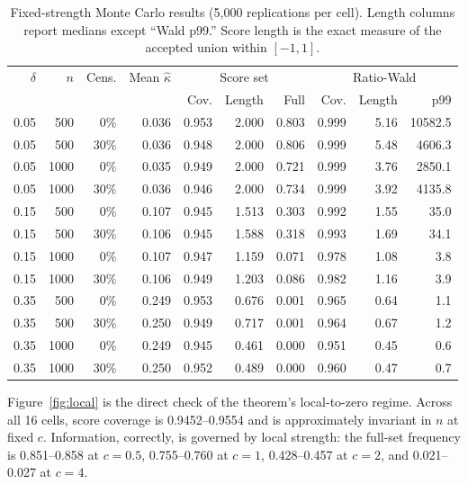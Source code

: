 \documentclass[
  10pt,
  letterpaper,
]{article}
\begin{document}
\begin{table}[tbp]
\centering
\caption{Fixed-strength Monte Carlo results (5,000 replications per
cell). Length columns report medians except ``Wald p99.'' Score length
is the exact measure of the accepted union within $[-1,1]$.}
\label{tab:simulation}
\scriptsize
\setlength{\tabcolsep}{3.2pt}
\begin{tabular}{rrr r rrr rrr}
\toprule
$\delta$ & $n$ & Cens. & Mean $\widehat\kappa$ & \multicolumn{3}{c}{Score set} & \multicolumn{3}{c}{Ratio-Wald} \\
\cmidrule(lr){5-7}\cmidrule(lr){8-10}
&&&& Cov. & Length & Full & Cov. & Length & p99 \\
\midrule
0.05 & 500 & 0\% & 0.036 & 0.953 & 2.000 & 0.803 & 0.999 & 5.16 & 10582.5 \\
0.05 & 500 & 30\% & 0.036 & 0.948 & 2.000 & 0.806 & 0.999 & 5.48 & 4606.3 \\
0.05 & 1000 & 0\% & 0.035 & 0.949 & 2.000 & 0.721 & 0.999 & 3.76 & 2850.1 \\
0.05 & 1000 & 30\% & 0.036 & 0.946 & 2.000 & 0.734 & 0.999 & 3.92 & 4135.8 \\
0.15 & 500 & 0\% & 0.107 & 0.945 & 1.513 & 0.303 & 0.992 & 1.55 & 35.0 \\
0.15 & 500 & 30\% & 0.106 & 0.945 & 1.588 & 0.318 & 0.993 & 1.69 & 34.1 \\
0.15 & 1000 & 0\% & 0.107 & 0.947 & 1.159 & 0.071 & 0.978 & 1.08 & 3.8 \\
0.15 & 1000 & 30\% & 0.106 & 0.949 & 1.203 & 0.086 & 0.982 & 1.16 & 3.9 \\
0.35 & 500 & 0\% & 0.249 & 0.953 & 0.676 & 0.001 & 0.965 & 0.64 & 1.1 \\
0.35 & 500 & 30\% & 0.250 & 0.949 & 0.717 & 0.001 & 0.964 & 0.67 & 1.2 \\
0.35 & 1000 & 0\% & 0.249 & 0.945 & 0.461 & 0.000 & 0.951 & 0.45 & 0.6 \\
0.35 & 1000 & 30\% & 0.250 & 0.952 & 0.489 & 0.000 & 0.960 & 0.47 & 0.7 \\
\bottomrule
\end{tabular}
\end{table}

Figure~\ref{fig:local} is the direct check of the theorem's
local-to-zero regime. Across all 16 cells, score coverage is
0.9452--0.9554 and is approximately invariant in $n$ at fixed $c$.
Information, correctly, is governed by local strength: the full-set
frequency is 0.851--0.858 at $c=0.5$, 0.755--0.760 at $c=1$,
0.428--0.457 at $c=2$, and 0.021--0.027 at $c=4$.
\end{document}
